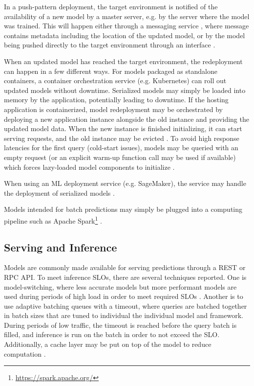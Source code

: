 In a push-pattern deployment, the target environment is notified of the availability of a new model by a master server, e.g. by the server where the model was trained.
This will happen either through a messaging service \cite{Liu2020, Garcia2020}, where message contains metadata including the location of the updated model, or by the model being pushed directly to the target environment through an interface \cite{Paeaekkoenen2020}.

When an updated model has reached the target environment, the redeployment can happen in a few different ways.
For models packaged as standalone containers, a container orchestration service (e.g. Kubernetes) can roll out updated models without downtime.
Serialized models may simply be loaded into memory by the application, potentially leading to downtime.
If the hosting application is containerized, model redeployment may be orchestrated by deploying a new application instance alongside the old instance and providing the updated model data.
When the new instance is finished initializing, it can start serving requests, and the old instance may be evicted \cite{Paeaekkoenen2020}.
To avoid high response latencies for the first query (cold-start issues), models may be queried with an empty request (or an explicit warm-up function call may be used if available) which forces lazy-loaded model components to initialize \cite{Li2017}.

When using an ML deployment service (e.g. SageMaker), the service may handle the deployment of serialized models \cite{Chahal2020}.

Models intended for batch predictions may simply be plugged into a computing pipeline such as Apache Spark\footnote{\url{https://spark.apache.org/}} \cite{Li2017}.

\subsection{Serving and Inference}
Models are commonly made available for serving predictions through a REST \cite{Krishnamurthi2019, Liu2020, Ruf2021, Garcia2020, Crankshaw2017, Paeaekkoenen2020} or RPC \cite{Ruf2021, Li2017, Crankshaw2017} API.
To meet inference SLOs, there are several techniques reported.
One is model-switching, where less accurate models but more performant models are used during periods of high load in order to meet required SLOs \cite{Zhang2020}.
Another is to use adaptive batching queues with a timeout, where queries are batched together in batch sizes that are tuned to individual the individual model and framework. During periods of low traffic, the timeout is reached before the query batch is filled, and inference is run on the batch in order to not exceed the SLO.
Additionally, a cache layer may be put on top of the model to reduce computation \cite{Crankshaw2017}.

